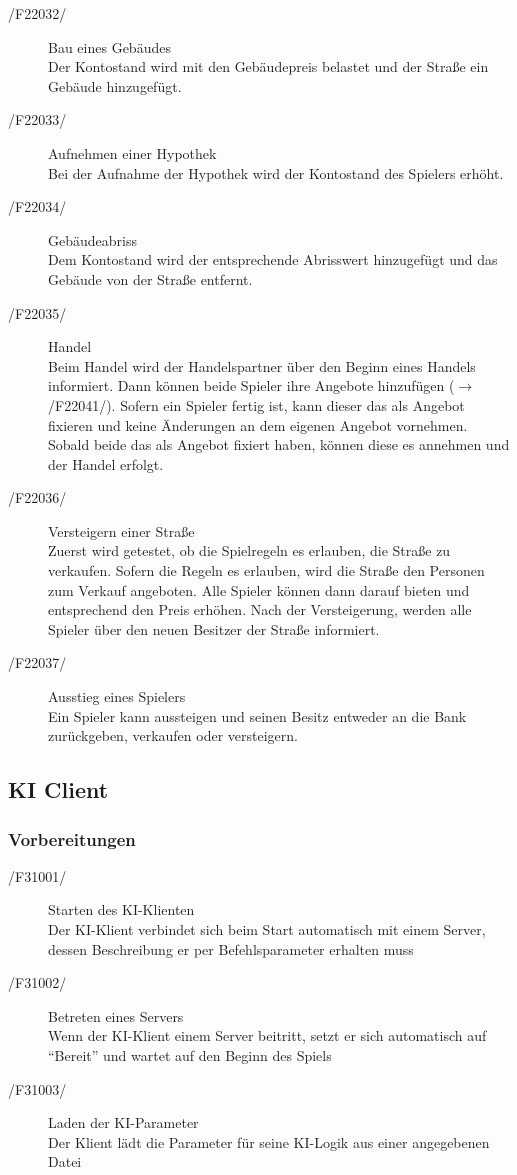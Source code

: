 \documentclass[a4paper,10pt]{article}
\begin{document}
\begin{description}
\item[/F22032/] Bau eines Gebäudes \\
Der Kontostand wird mit den Gebäudepreis belastet und der Straße ein Gebäude hinzugefügt.
\item[/F22033/] Aufnehmen einer Hypothek \\
Bei der Aufnahme der Hypothek wird der Kontostand des Spielers erhöht.
\item[/F22034/] Gebäudeabriss \\
Dem Kontostand wird der entsprechende Abrisswert hinzugefügt und das Gebäude von der Straße entfernt.
\item[/F22035/] Handel \\
Beim Handel wird der Handelspartner über den Beginn eines Handels informiert. Dann können beide Spieler ihre Angebote hinzufügen ($\rightarrow$ /F22041/). Sofern ein Spieler fertig ist, kann dieser das als Angebot fixieren und keine Änderungen an dem eigenen Angebot vornehmen. Sobald beide das als Angebot fixiert haben, können diese es annehmen und der Handel erfolgt.
\item[/F22036/] Versteigern einer Straße \\
Zuerst wird getestet, ob die Spielregeln es erlauben, die Straße zu verkaufen. Sofern die Regeln es erlauben, wird die Straße den Personen zum Verkauf angeboten. Alle Spieler können dann darauf bieten und entsprechend den Preis erhöhen. Nach der Versteigerung, werden alle Spieler über den neuen Besitzer der Straße informiert.
\item[/F22037/] Ausstieg eines Spielers \\
Ein Spieler kann aussteigen und seinen Besitz entweder an die Bank zurückgeben, verkaufen oder versteigern.
\end{description}

\subsection{KI Client}
\subsubsection{Vorbereitungen}
\begin{description}
\item[/F31001/]Starten des KI-Klienten\\
Der KI-Klient verbindet sich beim Start automatisch mit einem Server, dessen Beschreibung er per Befehlsparameter erhalten muss
\item[/F31002/]Betreten eines Servers\\
Wenn der KI-Klient einem Server beitritt, setzt er sich automatisch auf "`Bereit"' und wartet auf den Beginn des Spiels
\item[/F31003/] Laden der KI-Parameter \\
Der Klient lädt die Parameter für seine KI-Logik aus einer angegebenen Datei
\end{description}
\end{document}
